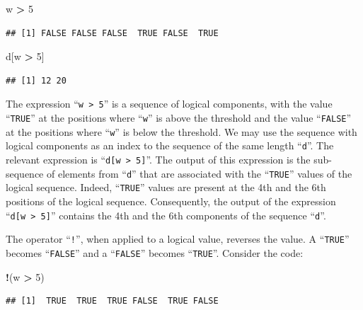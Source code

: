 \documentclass[]{krantz}
\makeatletter
\newenvironment{Shaded}{\begin{snugshade}}{\end{snugshade}}
\newcommand{\DecValTok}[1]{\textcolor[rgb]{0.00,0.00,0.81}{#1}}
\newcommand{\StringTok}[1]{\textcolor[rgb]{0.31,0.60,0.02}{#1}}
\newcommand{\OperatorTok}[1]{\textcolor[rgb]{0.81,0.36,0.00}{\textbf{#1}}}
\newcommand{\NormalTok}[1]{#1}
\newenvironment{kframe}{%
\medskip{}
\setlength{\fboxsep}{.8em}
 \def\at@end@of@kframe{}%
 \ifinner\ifhmode%
  \def\at@end@of@kframe{\end{minipage}}%
  \begin{minipage}{\columnwidth}%
 \fi\fi%
 \def\FrameCommand##1{\hskip\@totalleftmargin \hskip-\fboxsep
 \colorbox{shadecolor}{##1}\hskip-\fboxsep
     \hskip-\linewidth \hskip-\@totalleftmargin \hskip\columnwidth}%
 \MakeFramed {\advance\hsize-\width
   \@totalleftmargin\z@ \linewidth\hsize
   \@setminipage}}%
 {\par\unskip\endMakeFramed%
 \at@end@of@kframe}
\renewenvironment{Shaded}{\begin{kframe}}{\end{kframe}}
\theoremstyle{definition}
\theoremstyle{definition}
\theoremstyle{definition}
\theoremstyle{remark}
\makeatother
\begin{document}
\begin{Shaded}
\begin{Highlighting}[]
\NormalTok{w }\OperatorTok{>}\StringTok{ }\DecValTok{5}
\end{Highlighting}
\end{Shaded}

\begin{verbatim}
## [1] FALSE FALSE FALSE  TRUE FALSE  TRUE
\end{verbatim}

\begin{Shaded}
\begin{Highlighting}[]
\NormalTok{d[w }\OperatorTok{>}\StringTok{ }\DecValTok{5}\NormalTok{]}
\end{Highlighting}
\end{Shaded}

\begin{verbatim}
## [1] 12 20
\end{verbatim}

The expression ``\texttt{w\ \textgreater{}\ 5}'' is a sequence of
logical components, with the value ``\texttt{TRUE}'' at the positions
where ``\texttt{w}'' is above the threshold and the value
``\texttt{FALSE}'' at the positions where ``\texttt{w}'' is below the
threshold. We may use the sequence with logical components as an index
to the sequence of the same length ``\texttt{d}''. The relevant
expression is ``\texttt{d{[}w\ \textgreater{}\ 5{]}}''. The output of
this expression is the sub-sequence of elements from ``\texttt{d}'' that
are associated with the ``\texttt{TRUE}'' values of the logical
sequence. Indeed, ``\texttt{TRUE}'' values are present at the 4th and
the 6th positions of the logical sequence. Consequently, the output of
the expression ``\texttt{d{[}w\ \textgreater{}\ 5{]}}'' contains the 4th
and the 6th components of the sequence ``\texttt{d}''.

The operator ``\texttt{!}'', when applied to a logical value, reverses
the value. A ``\texttt{TRUE}'' becomes ``\texttt{FALSE}'' and a
``\texttt{FALSE}'' becomes ``\texttt{TRUE}''. Consider the code:

\begin{Shaded}
\begin{Highlighting}[]
\OperatorTok{!}\NormalTok{(w }\OperatorTok{>}\StringTok{ }\DecValTok{5}\NormalTok{)}
\end{Highlighting}
\end{Shaded}

\begin{verbatim}
## [1]  TRUE  TRUE  TRUE FALSE  TRUE FALSE
\end{verbatim}
\end{document}
